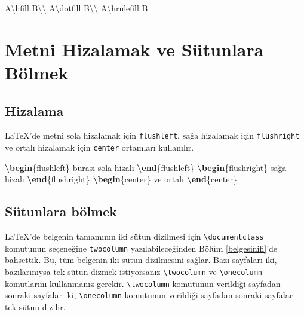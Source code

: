 \documentclass[
  10pt,
]{scrbook}
\newenvironment{Shaded}{\begin{snugshade}}{\end{snugshade}}
\newcommand{\ExtensionTok}[1]{#1}
\newcommand{\FunctionTok}[1]{\textcolor[rgb]{0.00,0.00,0.00}{#1}}
\newcommand{\KeywordTok}[1]{\textcolor[rgb]{0.13,0.29,0.53}{\textbf{#1}}}
\newcommand{\NormalTok}[1]{#1}
\theoremstyle{definition}
\theoremstyle{definition}
\theoremstyle{definition}
\theoremstyle{definition}
\theoremstyle{remark}
\begin{document}
\begin{Shaded}
\begin{Highlighting}[]
\NormalTok{A}\FunctionTok{\textbackslash{}hfill}\NormalTok{ B}\FunctionTok{\textbackslash{}\textbackslash{}}
\NormalTok{A}\FunctionTok{\textbackslash{}dotfill}\NormalTok{ B}\FunctionTok{\textbackslash{}\textbackslash{}}
\NormalTok{A}\FunctionTok{\textbackslash{}hrulefill}\NormalTok{ B}
\end{Highlighting}
\end{Shaded}

\hypertarget{metni-hizalamak-ve-suxfctunlara-buxf6lmek}{%
\section{Metni Hizalamak ve Sütunlara Bölmek}\label{metni-hizalamak-ve-suxfctunlara-buxf6lmek}}

\hypertarget{hizalama}{%
\subsection{Hizalama}\label{hizalama}}

LaTeX'de metni sola hizalamak için \texttt{flushleft}, sağa hizalamak için \texttt{flushright} ve ortalı hizalamak için \texttt{center} ortamları kullanılır.

\begin{Shaded}
\begin{Highlighting}[]
\KeywordTok{\textbackslash{}begin}\NormalTok{\{}\ExtensionTok{flushleft}\NormalTok{\}}
\NormalTok{ burası sola hizalı}
\KeywordTok{\textbackslash{}end}\NormalTok{\{}\ExtensionTok{flushleft}\NormalTok{\}}
\KeywordTok{\textbackslash{}begin}\NormalTok{\{}\ExtensionTok{flushright}\NormalTok{\}}
\NormalTok{ sağa hizalı}
\KeywordTok{\textbackslash{}end}\NormalTok{\{}\ExtensionTok{flushright}\NormalTok{\}}
\KeywordTok{\textbackslash{}begin}\NormalTok{\{}\ExtensionTok{center}\NormalTok{\}}
\NormalTok{ ve ortalı}
\KeywordTok{\textbackslash{}end}\NormalTok{\{}\ExtensionTok{center}\NormalTok{\}}
\end{Highlighting}
\end{Shaded}

\hypertarget{suxfctunlara-buxf6lmek}{%
\subsection{Sütunlara bölmek}\label{suxfctunlara-buxf6lmek}}

LaTeX'de belgenin tamamının iki sütun dizilmesi için \texttt{\textbackslash{}documentclass} komutunun seçeneğine \texttt{twocolumn} yazılabileceğinden Bölüm \ref{belgesinifi}'de bahsettik. Bu, tüm belgenin iki sütun dizilmesini sağlar. Bazı sayfaları iki, bazılarınıysa tek sütun dizmek istiyorsanız \texttt{\textbackslash{}twocolumn} ve \texttt{\textbackslash{}onecolumn} komutlarını kullanmanız gerekir. \texttt{\textbackslash{}twocolumn} komutunun verildiği sayfadan sonraki sayfalar iki, \texttt{\textbackslash{}onecolumn} komutunun verildiği sayfadan sonraki sayfalar tek sütun dizilir.
\end{document}
